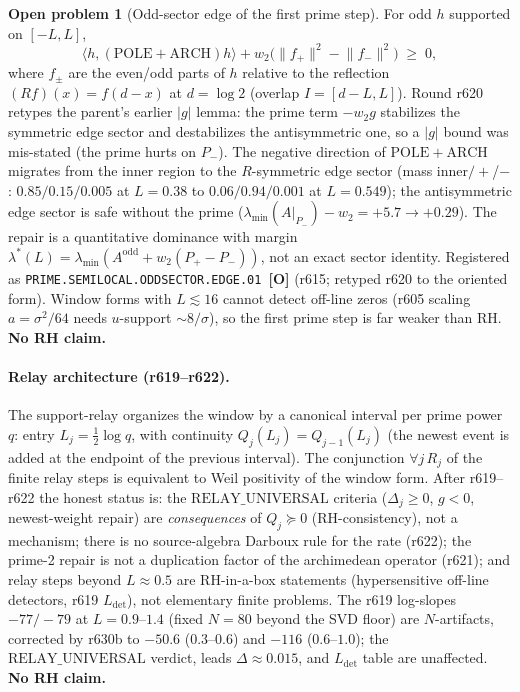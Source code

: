 \documentclass[11pt]{article}
\newcommand{\mO}{\textcolor{openred}{\textbf{[O]}}}
\theoremstyle{definition}
\newtheorem{openproblem}[theorem]{Open problem}
\theoremstyle{remark}
\begin{document}
\begin{openproblem}[Odd-sector edge of the first prime step]
For odd $h$ supported on $[-L,L]$,
\[
  \langle h,(\mathrm{POLE}+\mathrm{ARCH})h\rangle
  + w_2\bigl(\lVert f_+\rVert^2-\lVert f_-\rVert^2\bigr)
  \;\ge\; 0,
\]
where $f_\pm$ are the even/odd parts of $h$ relative to the
reflection $(Rf)(x)=f(d-x)$ at $d=\log 2$ (overlap
$I=[d-L,L]$).  Round r620 retypes the parent's earlier
$\lvert g\rvert$ lemma: the prime term $-w_2 g$ stabilizes the
symmetric edge sector and destabilizes the antisymmetric one,
so a $\lvert g\rvert$ bound was mis-stated (the prime hurts on
$P_-$).  The negative direction of $\mathrm{POLE}+\mathrm{ARCH}$
migrates from the inner region to the $R$-symmetric edge
sector (mass inner$/+$/$-$: $0.85/0.15/0.005$ at $L=0.38$ to
$0.06/0.94/0.001$ at $L=0.549$); the antisymmetric edge
sector is safe without the prime
($\lambda_{\min}(A|_{P_-})-w_2=+5.7\to +0.29$).
The repair is a quantitative dominance with margin
$\lambda^*(L)=\lambda_{\min}(A^{\mathrm{odd}}+w_2(P_+-P_-))$,
not an exact sector identity.
Registered as \texttt{PRIME.SEMILOCAL.ODDSECTOR.EDGE.01}~\mO
(r615; retyped r620 to the oriented form).
Window forms with $L\lesssim 16$ cannot detect off-line zeros
(r605 scaling $a=\sigma^2/64$ needs $u$-support $\sim 8/\sigma$),
so the first prime step is far weaker than RH.
\textbf{No RH claim.}
\end{openproblem}

\paragraph{Relay architecture (r619--r622).}
The support-relay organizes the window by a canonical interval
per prime power $q$: entry $L_j=\tfrac12\log q$, with continuity
$Q_j(L_j)=Q_{j-1}(L_j)$ (the newest event is added at the
endpoint of the previous interval).  The conjunction
$\forall j\,R_j$ of the finite relay steps is equivalent to
Weil positivity of the window form.  After r619--r622 the
honest status is: the $\mathrm{RELAY\_UNIVERSAL}$ criteria
($\Delta_j\ge 0$, $g<0$, newest-weight repair) are
\emph{consequences} of $Q_j\succeq 0$ (RH-consistency), not a
mechanism; there is no source-algebra Darboux rule for the
rate (r622); the prime-2 repair is not a duplication factor of
the archimedean operator (r621); and relay steps beyond
$L\approx 0.5$ are RH-in-a-box statements (hypersensitive
off-line detectors, r619 $L_{\mathrm{det}}$), not elementary
finite problems.  The r619 log-slopes $-77/-79$ at
$L=0.9$--$1.4$ (fixed $N=80$ beyond the SVD floor) are
$N$-artifacts, corrected by r630b to $-50.6$ ($0.3$--$0.6$)
and $-116$ ($0.6$--$1.0$); the $\mathrm{RELAY\_UNIVERSAL}$
verdict, leads $\Delta\approx 0.015$, and $L_{\mathrm{det}}$
table are unaffected.  \textbf{No RH claim.}
\end{document}
